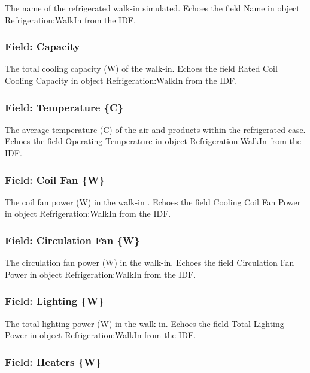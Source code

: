 The name of the refrigerated walk-in simulated. Echoes the field Name in object Refrigeration:WalkIn from the IDF.

\subsubsection{Field: Capacity}\label{field-capacity-1}

The total cooling capacity (W) of the walk-in. Echoes the field Rated Coil Cooling Capacity in object Refrigeration:WalkIn from the IDF.

\subsubsection{Field: Temperature \{C\}}\label{field-temperature-c-1}

The average temperature (C) of the air and products within the refrigerated case. Echoes the field Operating Temperature in object Refrigeration:WalkIn from the IDF.

\subsubsection{Field: Coil Fan \{W\}}\label{field-coil-fan-w}

The coil fan power (W) in the walk-in . Echoes the field Cooling Coil Fan Power in object Refrigeration:WalkIn from the IDF.

\subsubsection{Field: Circulation Fan \{W\}}\label{field-circulation-fan-w}

The circulation fan power (W) in the walk-in. Echoes the field Circulation Fan Power in object Refrigeration:WalkIn from the IDF.

\subsubsection{Field: Lighting \{W\}}\label{field-lighting-w}

The total lighting power (W) in the walk-in. Echoes the field Total Lighting Power in object Refrigeration:WalkIn from the IDF.

\subsubsection{Field: Heaters \{W\}}\label{field-heaters-w}

